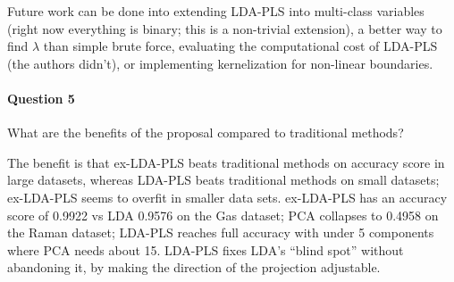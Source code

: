 \documentclass[journal]{IEEEtran}
\begin{document}
Future work can be done into extending LDA-PLS into multi-class variables (right now everything is binary; this is a non-trivial extension), a better way to find $\lambda$ than simple brute force, evaluating the computational cost of LDA-PLS (the authors didn't), or implementing kernelization for non-linear boundaries.
\\


\paragraph{Question 5} What are the benefits of the proposal compared to traditional methods?

The benefit is that ex-LDA-PLS beats traditional methods on accuracy score in large datasets, whereas LDA-PLS beats traditional methods on small datasets; ex-LDA-PLS seems to overfit in smaller data sets. ex-LDA-PLS has an accuracy score of 0.9922 vs LDA 0.9576 on the Gas dataset; PCA collapses to 0.4958 on the Raman dataset; LDA-PLS reaches full accuracy with under 5 components where PCA needs about 15. LDA-PLS fixes LDA's ``blind spot'' without abandoning it, by making the direction of the projection adjustable.
\end{document}
